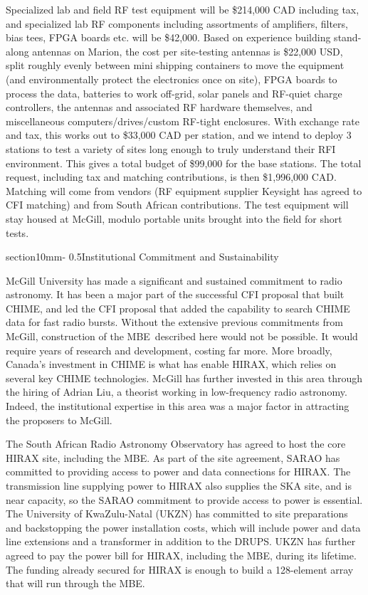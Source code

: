 \documentclass[letterpaper,11pt,preprint]{aastex}
\makeatletter
\newcommand{\mbe}{{\rm MBE}}
\renewcommand{\section}{\@startsection%
{section}{1}{0mm}{-\baselineskip}%
{0.5\baselineskip}{\normalfont\Large\bfseries}}%
\makeatother
\begin{document}
Specialized lab and field RF test equipment will be \$214,000 CAD
including tax, and specialized lab RF components including assortments
of amplifiers, filters, bias tees, FPGA boards etc. will be \$42,000.
Based on experience building stand-along antennas on Marion, the cost
per site-testing antennas is \$22,000 USD, split roughly evenly
between mini shipping containers to move the equipment (and
environmentally protect the electronics once on site), FPGA boards to
process the data, batteries to work off-grid, solar panels and
RF-quiet charge controllers, the antennas and associated RF hardware
themselves, and miscellaneous computers/drives/custom RF-tight
enclosures.  With exchange rate and tax, this works out to \$33,000
CAD per station, and we intend to deploy 3 stations to test a variety
of sites long enough to truly understand their RFI environment.  This
gives a total budget of \$99,000 for the base stations.  The total
request, including tax and matching contributions, is then \$1,996,000
CAD.  Matching will come from vendors (RF equipment supplier Keysight
has agreed to CFI matching) and from South African contributions.  The
test equipment will stay housed at McGill, modulo portable units
brought into the field for short tests.

\section{Institutional Commitment and Sustainability}

McGill University has made a significant and sustained commitment to
radio astronomy.  It has been a major part of the successful CFI
proposal that built CHIME, and led the CFI proposal that added the
capability to search CHIME data for fast radio bursts.  Without the
extensive previous commitments from McGill, construction of the
\mbe\ described here would not be possible.  It would require years of
research and development, costing far more.  More broadly, Canada's
investment in CHIME is what has enable HIRAX, which relies on several
key CHIME technologies.  McGill has further invested in this area
through the hiring of Adrian Liu, a theorist working in low-frequency
radio astronomy.  Indeed, the institutional expertise in this area was
a major factor in attracting the proposers to McGill.

The South African Radio Astronomy Observatory has agreed to host the
core HIRAX site, including the \mbe.  As part of the site agreement,
SARAO has committed to providing access to power and data connections
for HIRAX.  The transmission line supplying power to HIRAX also
supplies the SKA site, and is near capacity, so the SARAO commitment
to provide access to power is essential.  The University of
KwaZulu-Natal (UKZN) has committed to site preparations and
backstopping the power installation costs, which will include power
and data line extensions and a transformer in addition to the DRUPS.
UKZN has further agreed to pay the power bill for HIRAX, including the
\mbe, during its lifetime.  The funding already secured for HIRAX is
enough to build a 128-element array that will run through the \mbe.
\end{document}
